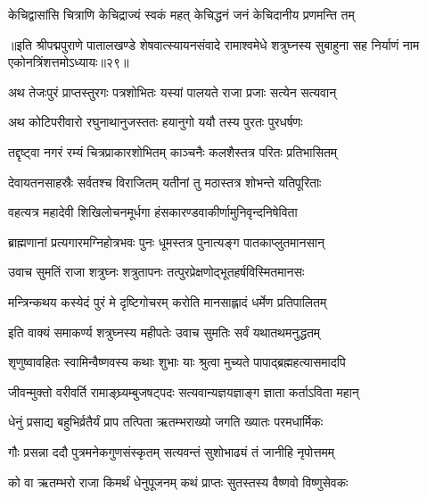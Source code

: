 \twolineshloka
{केचिद्वासांसि चित्राणि केचिद्राज्यं स्वकं महत्}
{केचिद्धनं जनं केचिदानीय प्रणमन्ति तम्}%

{॥इति श्रीपद्मपुराणे पातालखण्डे शेषवात्स्यायनसंवादे रामाश्वमेधे शत्रुघ्नस्य सुबाहुना सह निर्याणं नाम एकोनत्रिंशत्तमोऽध्यायः॥२९॥}

\resetShloka


\twolineshloka
{अथ तेजःपुरं प्राप्तस्तुरगः पत्रशोभितः}
{यस्यां पालयते राजा प्रजाः सत्येन सत्यवान्}%

\twolineshloka
{अथ कोटिपरीवारो रघुनाथानुजस्ततः}
{हयानुगो ययौ तस्य पुरतः पुरधर्षणः}%

\twolineshloka
{तद्दृष्ट्वा नगरं रम्यं चित्रप्राकारशोभितम्}
{काञ्चनैः कलशैस्तत्र परितः प्रतिभासितम्}%

\twolineshloka
{देवायतनसाहस्रैः सर्वतश्च विराजितम्}
{यतीनां तु मठास्तत्र शोभन्ते यतिपूरिताः}%

\twolineshloka
{वहत्यत्र महादेवी शिखिलोचनमूर्धगा}
{हंसकारण्डवाकीर्णामुनिवृन्दनिषेविता}%

\twolineshloka
{ब्राह्मणानां प्रत्यगारमग्निहोत्रभवः पुनः}
{धूमस्तत्र पुनात्यङ्ग पातकाप्लुतमानसान्}%

\twolineshloka
{उवाच सुमतिं राजा शत्रुघ्नः शत्रुतापनः}
{तत्पुरप्रेक्षणोद्भूतहर्षविस्मितमानसः}%


\twolineshloka
{मन्त्रिन्कथय कस्येदं पुरं मे दृष्टिगोचरम्}
{करोति मानसाह्लादं धर्मेण प्रतिपालितम्}%


\twolineshloka
{इति वाक्यं समाकर्ण्य शत्रुघ्नस्य महीपतेः}
{उवाच सुमतिः सर्वं यथातथमनुद्धतम्}%


\twolineshloka
{शृणुष्वावहितः स्वामिन्वैष्णवस्य कथाः शुभाः}
{याः श्रुत्वा मुच्यते पापाद्ब्रह्महत्यासमादपि}%

\twolineshloka
{जीवन्मुक्तो वरीवर्ति रामाङ्घ्र्यम्बुजषट्पदः}
{सत्यवान्यज्ञयज्ञाङ्ग ज्ञाता कर्ताऽविता महान्}%

\twolineshloka
{धेनुं प्रसाद्य बहुभिर्व्रतैर्यं प्राप तत्पिता}
{ऋतम्भराख्यो जगति ख्यातः परमधार्मिकः}%

\twolineshloka
{गौः प्रसन्ना ददौ पुत्रमनेकगुणसंस्कृतम्}
{सत्यवन्तं सुशोभाढ्यं तं जानीहि नृपोत्तमम्}%


\twolineshloka
{को वा ऋतम्भरो राजा किमर्थं धेनुपूजनम्}
{कथं प्राप्तः सुतस्तस्य वैष्णवो विष्णुसेवकः}%

